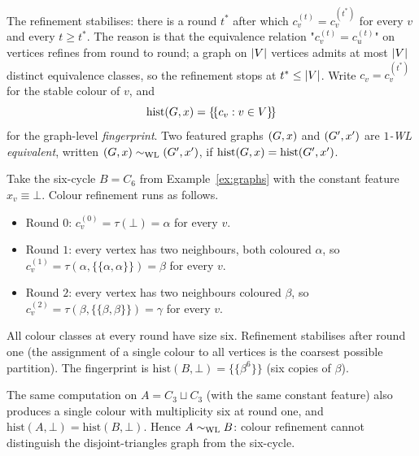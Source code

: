 The refinement stabilises: there is a round $t^\ast$ after which
$c_v^{(t)} = c_v^{(t^\ast)}$ for every $v$ and every $t \ge t^\ast$.
The reason is that the equivalence relation "$c_v^{(t)} = c_u^{(t)}$"
on vertices refines from round to round; a graph on $|V|$
vertices admits at most $|V|$ distinct equivalence classes, so
the refinement stops at $t^\ast \le |V|$. Write $c_v =
c_v^{(t^\ast)}$ for the stable colour of $v$, and
\[
\mathrm{hist}(G, x) = \{\!\{c_v : v \in V\}\!\}
\]
for the graph-level \emph{fingerprint}. Two featured graphs $(G,
x)$ and $(G', x')$ are \emph{$1$-WL equivalent}, written $(G,
x) \sim_{\mathrm{WL}} (G', x')$, if $\mathrm{hist}(G, x) = \mathrm{hist}(G',
x')$.

\begin{example}\label{ex:wl-c6}
Take the six-cycle $B = C_6$ from Example~\ref{ex:graphs} with the constant
feature $x_v \equiv \bot$. Colour refinement runs as follows.
\begin{itemize}
\item Round $0$: $c_v^{(0)} = \tau(\bot) = \alpha$ for every $v$.
\item Round $1$: every vertex has two neighbours, both coloured
$\alpha$, so $c_v^{(1)} = \tau(\alpha, \{\!\{\alpha, \alpha\}\!\}) =
\beta$ for every $v$.
\item Round $2$: every vertex has two neighbours coloured $\beta$, so
$c_v^{(2)} = \tau(\beta, \{\!\{\beta, \beta\}\!\}) = \gamma$ for every
$v$.
\end{itemize}
All colour classes at every round have size six. Refinement stabilises
after round one (the assignment of a single colour to all vertices is
the coarsest possible partition). The fingerprint is
$\mathrm{hist}(B, \bot) = \{\!\{\beta^6\}\!\}$ (six copies of $\beta$).

The same computation on $A = C_3 \sqcup C_3$ (with the same constant
feature) also produces a single colour with multiplicity six at
round one, and $\mathrm{hist}(A, \bot) = \mathrm{hist}(B, \bot)$.
Hence $A \sim_{\mathrm{WL}} B$: colour refinement cannot distinguish the
disjoint-triangles graph from the six-cycle.
\end{example}

